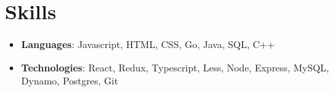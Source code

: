\documentclass[letterpaper,11pt]{article}
\newcommand{\resumeSubHeadingListStart}{\begin{itemize}[leftmargin=*]}
\newcommand{\resumeSubHeadingListEnd}{\end{itemize}}
\begin{document}
\section{Skills}
 \resumeSubHeadingListStart
   \item{
    \textbf{Languages}{: Javascript, HTML, CSS, Go, Java, SQL, C++}
  }
  \item{
    \textbf{Technologies}{: React, Redux, Typescript, Less, Node, Express, MySQL, Dynamo, Postgres, Git}
  }

 \resumeSubHeadingListEnd


\end{document}
